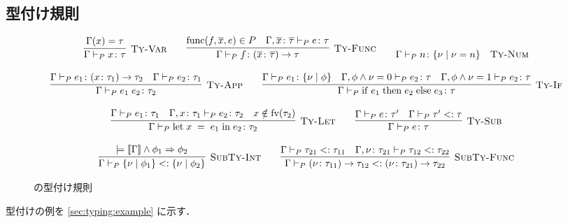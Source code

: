 \subsection{型付け規則}
\label{sec:type-system}

\begin{figure}[H]
  \begin{align*}\begin{array}{c}
    \infer[\TyRuleVar] {
      \TyJudge{P}{\Gamma}{x}{\tau}
    } {
      \Gamma\paren{x} = \tau
    } \quad\quad
    \infer[\TyRuleFunc] {
      \TyJudge{P}{\Gamma}{f}{\TyFunc{\seq{x}}{\seq{\tau}}{\tau}}
    } {
      \Func{f}{\seq{x}}{e} \in P
      \quad \TyJudge{P}{\Gamma, \typed{\seq{x}}{\seq{\tau}}}{e}{\tau}
    } \quad\quad
    \TyJudge{P}{\Gamma}{n}{\TyInt{\nu}{\nu = n}} \quad \text{\TyRuleNum} \\\\
    \infer[\TyRuleApp] {
      \TyJudge{P}{\Gamma}{\App{e_1}{e_2}}{\tau_2}
    } {
      \TyJudge{P}{\Gamma}{e_1}{\TyFunc{x}{\tau_1}{\tau_2}}
      \quad \TyJudge{P}{\Gamma}{e_2}{\tau_1}
    } \quad\quad
    \infer[\TyRuleIf] {
      \TyJudge{P}{\Gamma}{\If{e_1}{e_2}{e_3}}{\tau}
    } {
      \TyJudge{P}{\Gamma}{e_1}{\TyInt{\nu}{\phi}}
      \quad \TyJudge{P}{\Gamma, \FormulaAnd{\phi}{\TermEq{\nu}{0}}}{e_2}{\tau}
      \quad \TyJudge{P}{\Gamma, \FormulaAnd{\phi}{\TermEq{\nu}{1}}}{e_2}{\tau}
    } \\\\
    \infer[\TyRuleLet] {
      \TyJudge{P}{\Gamma}{\Let{x}{e_1}{e_2}}{\tau_2}
    } {
      \TyJudge{P}{\Gamma}{e_1}{\tau_1}
      \quad \TyJudge{P}{\Gamma, \typed{x}{\tau_1}}{e_2}{\tau_2}
      \quad x \notin \fv{\tau_2}
    } \quad\quad
    \infer[\TyRuleSub] {
      \TyJudge{P}{\Gamma}{e}{\tau}
    } {
      \TyJudge{P}{\Gamma}{e}{\tau'}
      \quad \SubTyJudge{P}{\Gamma}{\tau'}{\tau}
    } \\\\
    \infer[\SubTyRuleInt] {
      \SubTyJudge{P}{\Gamma}{\TyInt{\nu}{\phi_1}}{\TyInt{\nu}{\phi_2}}
    } {
      \models \FormulaAnd{\sem{\Gamma}}{\phi_1} \Rightarrow \phi_2
    } \quad\quad
    \infer[\SubTyRuleFunc] {
      \SubTyJudge{P}{\Gamma}{\TyFunc{\nu}{\tau_{11}}{\tau_{12}}}{\TyFunc{\nu}{\tau_{21}}{\tau_{22}}}
    } {
      \SubTyJudge{P}{\Gamma}{\tau_{21}}{\tau_{11}}
      \quad \SubTyJudge{P}{\Gamma, \typed{\nu}{\tau_{21}}}{\tau_{12}}{\tau_{22}}
    }
  \end{array}\end{align*}
  \caption{\Yil の型付け規則}
  \label{fig:typing-rules}
\end{figure}

\par 型付けの例を \ref{sec:typing:example} に示す．
